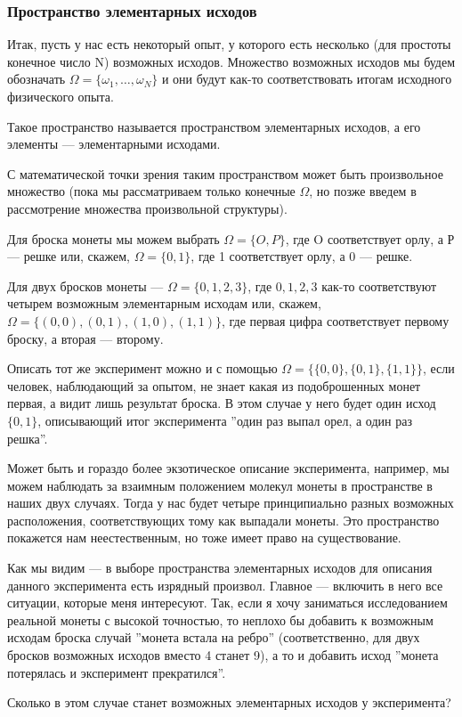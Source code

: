 \documentclass[11 pt,russian]{article}
\begin{document}
\subsubsection{Пространство элементарных исходов}
Итак, пусть у нас есть некоторый опыт, у которого есть несколько (для простоты конечное число N) возможных исходов. Множество возможных исходов мы будем обозначать $\Omega=\{\omega_1,\dotsc,\omega_N\}$ и они будут как-то соответствовать итогам исходного физического опыта. 
\begin{Def}
Такое пространство называется пространством элементарных исходов, а его элементы --- элементарными исходами.
\end{Def}
С математической точки зрения таким пространством может быть произвольное множество (пока мы рассматриваем только конечные $\Omega$, но позже введем в рассмотрение множества произвольной структуры).
\begin{Exam}
Для броска монеты мы можем выбрать $\Omega = \{O, P\}$, где O соответствует орлу, а Р --- решке или, скажем, $\Omega =\{0,1\}$, где 1 соответствует орлу, а 0 --- решке.

Для двух бросков монеты --- 
$\Omega = \{0,1,2,3\}$, где $0,1,2,3$ как-то соответствуют четырем возможным элементарным исходам или, скажем, $\Omega = \{(0,0), (0,1), (1,0), (1,1)\}$, где первая цифра соответствует первому броску, а вторая --- второму.

Описать тот же эксперимент можно и с помощью $\Omega = \{\{0,0\}, \{0,1\}, \{1,1\}\}$, если человек, наблюдающий за опытом, не знает какая из подоброшенных монет первая, а видит лишь результат броска. В этом случае у него будет один исход $\{0,1\}$, описывающий итог эксперимента ''один раз выпал орел, а один раз решка''.

Может быть и гораздо более экзотическое описание эксперимента, например, мы можем наблюдать за взаимным положением молекул монеты в пространстве в наших двух случаях. Тогда у нас будет четыре принципиально разных возможных расположения, соответствующих тому как выпадали монеты. Это пространство покажется нам неестественным, но тоже имеет право на существование.
\end{Exam}
Как мы видим --- в выборе пространства элементарных исходов для описания данного эксперимента есть изрядный произвол. Главное --- включить в него все ситуации, которые меня интересуют. Так, если я хочу заниматься исследованием реальной монеты с высокой точностью, то неплохо бы добавить к возможным исходам броска случай ''монета встала на ребро'' (соответственно, для двух бросков возможных исходов вместо 4 станет 9), а то и добавить исход ''монета потерялась и эксперимент прекратился''.
\begin{Que}
Сколько в этом случае станет возможных элементарных исходов у эксперимента?
\end{Que}
\end{document}
